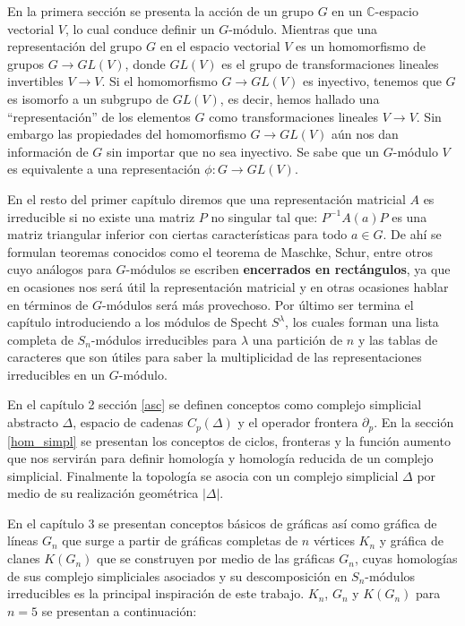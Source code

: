 \documentclass[12pt]{book}
\theoremstyle{definition}
\newcounter{in}
\newcounter{ini}
\begin{document}
 En la primera sección se presenta la acción de un grupo $G$ en un
 $\mathbb{C}$-espacio vectorial $V$, lo cual conduce definir un
 $G$-módulo. Mientras que una representación del grupo $G$ en el
 espacio vectorial $V$ es un homomorfismo de grupos $G \to GL(V)$,
 donde $GL(V)$ es el grupo de transformaciones lineales invertibles
 $V \to V$. Si el homomorfismo $G \to GL(V)$ es inyectivo, tenemos que
 $G$ es isomorfo a un subgrupo de $GL(V)$, es decir, hemos hallado una
 ``representación'' de los elementos $G$ como transformaciones
 lineales $V \to V$. Sin embargo las propiedades del homomorfismo
 $G \to GL(V)$ aún nos dan información de $G$ sin importar que no sea
 inyectivo. Se sabe que un $G$-módulo $V$ es equivalente a una
 representación $\phi \colon G \to GL(V)$.

 En el resto del primer capítulo diremos que una representación
 matricial $A$ es irreducible si no existe una matriz $P$ no singular tal
 que: $P^{-1}A(a)P$ es una matriz triangular inferior con ciertas
 características para todo $a \in G$. De ahí se formulan teoremas
 conocidos como el teorema de Maschke, Schur, entre otros cuyo análogos para
 $G$-módulos se escriben \textbf{encerrados en rectángulos}, ya que en
 ocasiones nos será útil la representación matricial y en otras
 ocasiones hablar en términos de $G$-módulos será más provechoso. Por
 último ser termina el capítulo introduciendo a los módulos de Specht
 $S^{\lambda}$, los cuales forman una lista completa de $S_n$-módulos
 irreducibles para $\lambda$ una partición de $n$ y las tablas de
 caracteres que son útiles para saber la multiplicidad de
 las representaciones irreducibles en un $G$-módulo.

 En el capítulo 2 sección \ref{asc} se definen conceptos como complejo
 simplicial abstracto $\Delta$, espacio de cadenas $C_{p}(\Delta)$ y
 el operador frontera $\partial_{p}$. En la sección \ref{hom_simpl} se
 presentan los conceptos de ciclos, fronteras y la función aumento que
 nos servirán para definir homología y homología reducida de un
 complejo simplicial. Finalmente la topología se asocia con un
 complejo simplicial $\Delta$ por medio de su realización geométrica
 $|\Delta|$.

En el capítulo $3$ se presentan conceptos básicos de gráficas así
como gráfica de líneas $G_n$ que surge a partir de gráficas completas
de $n$ vértices $K_n$ y gráfica de clanes $K(G_n)$ que se construyen
por medio de las gráficas $G_n$, cuyas homologías de sus complejo
simpliciales asociados y su descomposición en $S_n$-módulos
irreducibles es la principal inspiración de este trabajo. $K_n$, $G_n$
y $K(G_n)$ para $n = 5$ se presentan a continuación:
\end{document}
